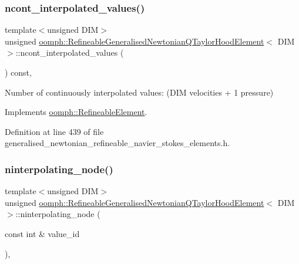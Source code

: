 \subsubsection{\texorpdfstring{ncont\+\_\+interpolated\+\_\+values()}{ncont\_interpolated\_values()}}
{\footnotesize\ttfamily template$<$unsigned D\+IM$>$ \\
unsigned \hyperlink{classoomph_1_1RefineableGeneralisedNewtonianQTaylorHoodElement}{oomph\+::\+Refineable\+Generalised\+Newtonian\+Q\+Taylor\+Hood\+Element}$<$ D\+IM $>$\+::ncont\+\_\+interpolated\+\_\+values (\begin{DoxyParamCaption}{ }\end{DoxyParamCaption}) const\hspace{0.3cm}{\ttfamily [inline]}, {\ttfamily [virtual]}}



Number of continuously interpolated values\+: (D\+IM velocities + 1 pressure) 



Implements \hyperlink{classoomph_1_1RefineableElement_a53e171a18c9f43f1db90a6876516a073}{oomph\+::\+Refineable\+Element}.



Definition at line 439 of file generalised\+\_\+newtonian\+\_\+refineable\+\_\+navier\+\_\+stokes\+\_\+elements.\+h.

\mbox{\label{classoomph_1_1RefineableGeneralisedNewtonianQTaylorHoodElement_a074d030db713c63e1077446d0bab5c1a}} 
\subsubsection{\texorpdfstring{ninterpolating\+\_\+node()}{ninterpolating\_node()}}
{\footnotesize\ttfamily template$<$unsigned D\+IM$>$ \\
unsigned \hyperlink{classoomph_1_1RefineableGeneralisedNewtonianQTaylorHoodElement}{oomph\+::\+Refineable\+Generalised\+Newtonian\+Q\+Taylor\+Hood\+Element}$<$ D\+IM $>$\+::ninterpolating\+\_\+node (\begin{DoxyParamCaption}\item[{const int \&}]{value\+\_\+id }\end{DoxyParamCaption})\hspace{0.3cm}{\ttfamily [inline]}, {\ttfamily [virtual]}}



